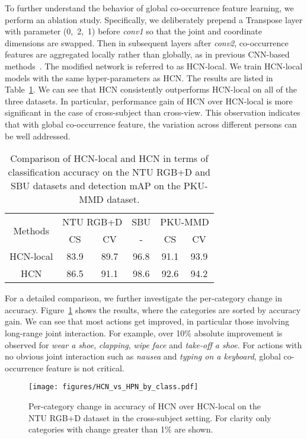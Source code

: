 \documentclass{article}
\begin{document}
To further understand the behavior of global co-occurrence feature learning, we perform an ablation study. Specifically, we deliberately prepend a Transpose layer with parameter (0,~2,~1) before \emph{conv1} so that the joint and coordinate dimensions are swapped. Then in subsequent layers after \emph{conv2}, co-occurrence features are aggregated locally rather than globally, as in previous CNN-based methods~\cite{Du2016Skeleton,Ke_2017_CVPR,Li_2017_ICMEW}. The modified network is referred to as HCN-local. We train HCN-local models with the same hyper-parameters as HCN. The results are listed in Table~\ref{table:HPN_HCN}. We can see that HCN consistently outperforms HCN-local on all of the three datasets. In particular, performance gain of HCN over HCN-local is more significant in the case of cross-subject than cross-view. This observation indicates that with global co-occurrence feature, the variation across different persons can be well addressed.

\begin{table}[htbp]
  \centering
  \begin{tabular}{c|cc|c|cc}\hline
    \multirow{2}{*}{Methods} & \multicolumn{2}{c|}{NTU RGB+D} & SBU & \multicolumn{2}{c}{PKU-MMD} \\
              & CS   & CV   & -    & CS   & CV   \\ \hline
    HCN-local & 83.9 & 89.7 & 96.8 & 91.1 & 93.9 \\
    HCN       & 86.5 & 91.1 & 98.6 & 92.6 & 94.2 \\
    \hline
  \end{tabular}
\caption{Comparison of HCN-local and HCN in terms of classification accuracy on the NTU RGB+D and SBU datasets and detection mAP on the PKU-MMD dataset.}
  \label{table:HPN_HCN}
\end{table}

For a detailed comparison, we further investigate the per-category change in accuracy. Figure~\ref{fig:HCN-HPN-by-class} shows the results, where the categories are sorted by accuracy gain. We can see that most actions get improved, in particular those involving long-range joint interaction. For example, over 10\% absolute improvement is observed for \emph{wear a shoe}, \emph{clapping}, \emph{wipe face} and \emph{take-off a shoe}. For actions with no obvious joint interaction such as \emph{nausea} and \emph{typing on a keyboard}, global co-occurrence feature is not critical.

\begin{figure}[htbp]
  \centering
  \texttt{[image: figures/HCN\_vs\_HPN\_by\_class.pdf]}
  \caption{Per-category change in accuracy of HCN over HCN-local on the NTU RGB+D dataset in the cross-subject setting. For clarity only categories with change greater than 1\% are shown.}
  \label{fig:HCN-HPN-by-class}
\end{figure}
\end{document}
